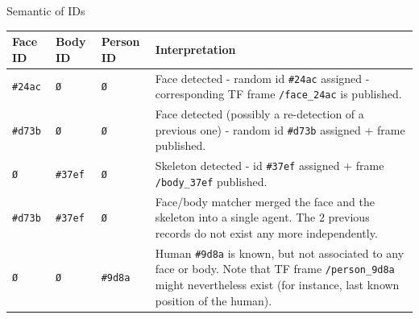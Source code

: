 \documentclass[xcolor=table]{beamer}
\begin{document}
\begin{frame}{Semantic of IDs}
    \scriptsize
    \begin{tabular}{@{}lllp{6.5cm}@{}}
\toprule
\textbf{Face ID} & \textbf{Body ID} & \textbf{Person ID} & \textbf{Interpretation}                                                                                                                                                                                                                                                                 \\ \midrule
        \texttt{\#24ac }          & \texttt{Ø     }           & \texttt{Ø     }             & \tiny Face detected - random id \texttt{\#24ac} assigned - corresponding TF frame \texttt{/face\_24ac} is published.                                                                                                                                                                                            \\
        \texttt{\#d73b }          & \texttt{Ø     }           & \texttt{Ø     }             & \tiny Face detected (possibly a re-detection of a previous one) - random id \texttt{\#d73b} assigned + frame published.                                                                                                                                                                                \\
        \texttt{Ø      }          & \texttt{\#37ef}           & \texttt{Ø     }             & \tiny Skeleton detected - id \texttt{\#37ef} assigned + frame \texttt{/body\_37ef} published.                                                                                                                                                                                                                   \\
        \texttt{\#d73b }          & \texttt{\#37ef}           & \texttt{Ø     }             & \tiny Face/body matcher merged the face and the skeleton into a single agent. The 2 previous records do not exist any more independently.                                                                                                                                                     \\
        \texttt{Ø      }          & \texttt{Ø     }           & \texttt{\#9d8a}             & \tiny Human \texttt{\#9d8a} is known, but not associated to any face or body. Note that TF frame \texttt{/person\_9d8a} might nevertheless exist (for instance, last known position of the human).                                                                                                              \\

\end{tabular}
\end{frame}
\end{document}
